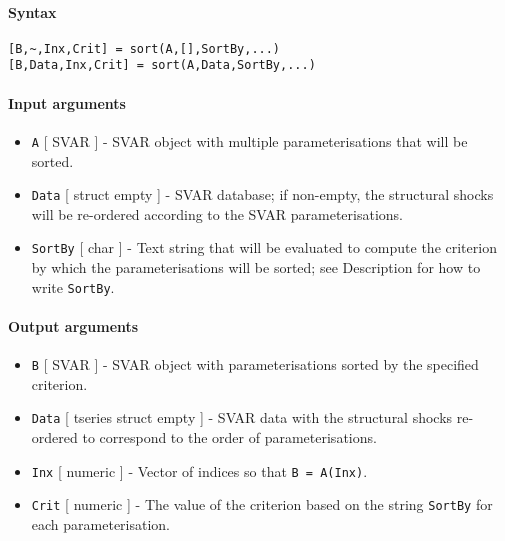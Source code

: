 


	\paragraph{Syntax}\label{syntax}

\begin{verbatim}
[B,~,Inx,Crit] = sort(A,[],SortBy,...)
[B,Data,Inx,Crit] = sort(A,Data,SortBy,...)
\end{verbatim}

\paragraph{Input arguments}\label{input-arguments}

\begin{itemize}
\item
  \texttt{A} {[} SVAR {]} - SVAR object with multiple parameterisations
  that will be sorted.
\item
  \texttt{Data} {[} struct \textbar{} empty {]} - SVAR database; if
  non-empty, the structural shocks will be re-ordered according to the
  SVAR parameterisations.
\item
  \texttt{SortBy} {[} char {]} - Text string that will be evaluated to
  compute the criterion by which the parameterisations will be sorted;
  see Description for how to write \texttt{SortBy}.
\end{itemize}

\paragraph{Output arguments}\label{output-arguments}

\begin{itemize}
\item
  \texttt{B} {[} SVAR {]} - SVAR object with parameterisations sorted by
  the specified criterion.
\item
  \texttt{Data} {[} tseries \textbar{} struct \textbar{} empty {]} -
  SVAR data with the structural shocks re-ordered to correspond to the
  order of parameterisations.
\item
  \texttt{Inx} {[} numeric {]} - Vector of indices so that
  \texttt{B = A(Inx)}.
\item
  \texttt{Crit} {[} numeric {]} - The value of the criterion based on
  the string \texttt{SortBy} for each parameterisation.
\end{itemize}

